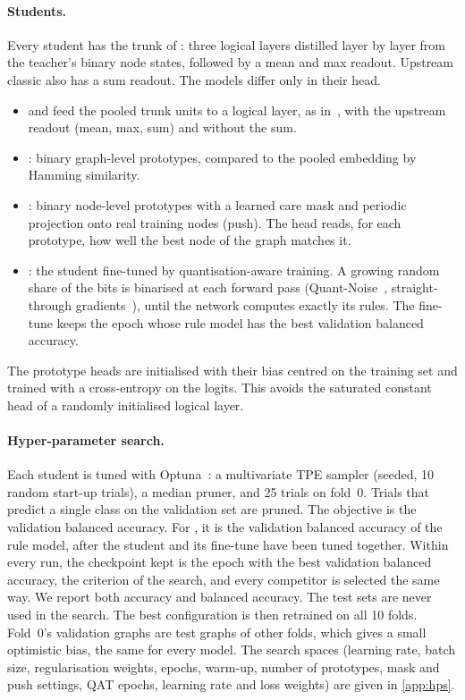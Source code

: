 \paragraph{Students.}
Every student has the trunk of \logix{}: three logical layers distilled layer by layer
from the teacher's binary node states, followed by a mean and max readout. Upstream classic
\logix{} also has a sum readout. The models differ only in their head.
\begin{itemize}
  \item \textbf{\classic{}} and \textbf{\classicnosum{}} feed the pooled trunk units to a logical layer, as in~,
    with the upstream readout (mean, max, sum) and without the sum.
  \item \textbf{\oursgraph{}}: binary graph-level prototypes, compared to the pooled
    embedding by Hamming similarity.
  \item \textbf{\oursnmp{}}: binary node-level prototypes with a learned care
    mask and periodic projection onto real training nodes (push). The head reads, for each
    prototype, how well the best node of the graph matches it.
  \item \textbf{\oursqat{}}: the \nmp{} student fine-tuned by quantisation-aware
    training. A growing random share of the bits is binarised at each forward pass
    (Quant-Noise~, straight-through gradients~), until the network computes exactly its rules. The fine-tune keeps
    the epoch whose rule model has the best validation balanced accuracy.
\end{itemize}
The prototype heads are initialised with their bias centred on the training set and trained
with a cross-entropy on the logits. This avoids the saturated constant head of a randomly
initialised logical layer.

\paragraph{Hyper-parameter search.}
Each student is tuned with Optuna~: a multivariate TPE sampler (seeded, 10 random
start-up trials), a median pruner, and 25 trials on fold~0. Trials that predict a single
class on the validation set are pruned. The objective is the validation balanced
accuracy. For \nmpqat{}, it is the validation balanced accuracy of the rule model, after
the student and its fine-tune have been tuned together. Within every run, the checkpoint
kept is the epoch with the best validation balanced accuracy, the criterion of the search,
and every competitor is selected the same way. We report both accuracy and balanced
accuracy. The test sets are never used in the search. The best configuration is then retrained on all 10 folds. Fold~0's validation
graphs are test graphs of other folds, which gives a small optimistic bias, the same for
every model. The search spaces (learning rate, batch size, regularisation weights,
epochs, warm-up, number of prototypes, mask and push settings, QAT epochs, learning rate and
loss weights) are given in \cref{app:hps}.

